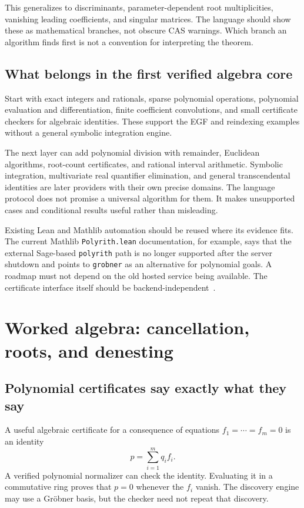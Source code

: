 \documentclass[11pt,a4paper]{article}
\newcommand{\code}[1]{\nolinkurl{#1}}
\theoremstyle{definition}
\begin{document}
This generalizes to discriminants, parameter-dependent root multiplicities,
vanishing leading coefficients, and singular matrices. The language should show
these as mathematical branches, not obscure CAS warnings. Which branch an
algorithm finds first is not a convention for interpreting the theorem.

\subsection{What belongs in the first verified algebra core}
Start with exact integers and rationals, sparse polynomial operations, polynomial
evaluation and differentiation, finite coefficient convolutions, and small
certificate checkers for algebraic identities. These support the EGF and
reindexing examples without a general symbolic integration engine.

The next layer can add polynomial division with remainder, Euclidean algorithms,
root-count certificates, and rational interval arithmetic. Symbolic integration,
multivariate real quantifier elimination, and general transcendental identities
are later providers with their own precise domains. The language protocol does
not promise a universal algorithm for them. It makes unsupported cases and
conditional results useful rather than misleading.

Existing Lean and Mathlib automation should be reused where its evidence fits.
The current Mathlib \code{Polyrith.lean} documentation, for example, says that the
external Sage-based \code{polyrith} path is no longer supported after the server
shutdown and points to \code{grobner} as an alternative for polynomial goals.
A roadmap must not depend on the old hosted service being available. The
certificate interface itself should be backend-independent~\cite{polyrith}.

\section{Worked algebra: cancellation, roots, and denesting}\label{sec:algebra}
\subsection{Polynomial certificates say exactly what they say}
A useful algebraic certificate for a consequence of equations
\(f_1=\cdots=f_m=0\) is an identity
\[
 p=\sum_{i=1}^{m}q_i f_i.
\]
A verified polynomial normalizer can check the identity. Evaluating it in a
commutative ring proves that \(p=0\) whenever the \(f_i\) vanish. The discovery
engine may use a Gr\"obner basis, but the checker need not repeat that discovery.
\end{document}
